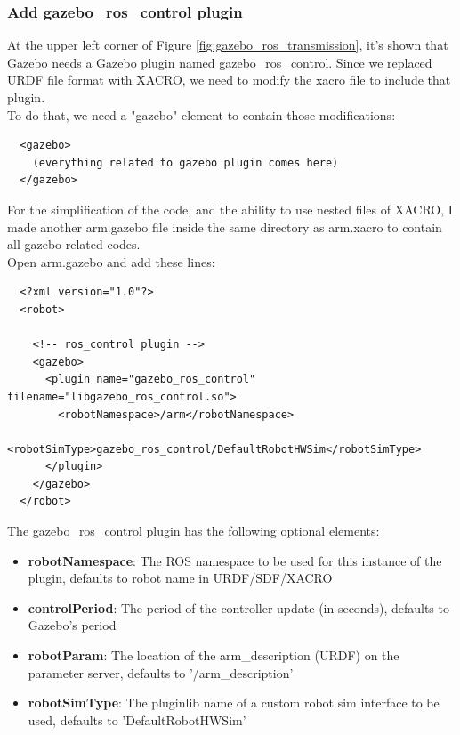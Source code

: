\documentclass[pdftex,12pt,a4paper]{article}
\begin{document}
  \subsubsection{Add gazebo\_ros\_control plugin}
  At the upper left corner of Figure \ref{fig:gazebo_ros_transmission}, it's shown that Gazebo needs a Gazebo plugin named gazebo\_ros\_control. Since we replaced URDF file format with XACRO, we need to modify the xacro file to include that plugin.\\
  To do that, we need a "gazebo" element to contain those modifications:
  \begin{lstlisting}
  <gazebo>
    (everything related to gazebo plugin comes here)
  </gazebo>
  \end{lstlisting}
  For the simplification of the code, and the ability to use nested files of XACRO, I made another arm.gazebo file inside the same directory as arm.xacro to contain all gazebo-related codes.\\
  Open arm.gazebo and add these lines:
  \begin{lstlisting}
  <?xml version="1.0"?>
  <robot>
  
    <!-- ros_control plugin -->
    <gazebo>
      <plugin name="gazebo_ros_control" filename="libgazebo_ros_control.so">
        <robotNamespace>/arm</robotNamespace>
        <robotSimType>gazebo_ros_control/DefaultRobotHWSim</robotSimType>
      </plugin>
    </gazebo>
  </robot>
  \end{lstlisting}
  The gazebo\_ros\_control plugin has the following optional elements:
  \begin{itemize}
  \item \textbf{robotNamespace}: The ROS namespace to be used for this instance of the plugin, defaults to robot name in URDF/SDF/XACRO
  \item \textbf{controlPeriod}: The period of the controller update (in seconds), defaults to Gazebo's period
  \item \textbf{robotParam}: The location of the arm\_description (URDF) on the parameter server, defaults to '/arm\_description'
  \item \textbf{robotSimType}: The pluginlib name of a custom robot sim interface to be used, defaults to 'DefaultRobotHWSim'
  \end{itemize}
  
  \newpage
\end{document}
